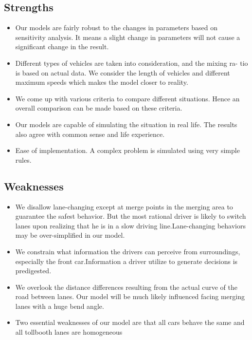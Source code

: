 \subsection{Strengths}
\begin{itemize}
\item
Our models are fairly robust to the changes in parameters based on sensitivity analysis. It means a slight change in parameters will not cause a significant change in the result.
\item
Different types of vehicles are taken into consideration, and the mixing ra-
tio is based on actual data. We consider the length of vehicles and different
maximum speeds which makes the model closer to reality.
\item
We come up with various criteria to compare different situations. Hence
an overall comparison can be made based on these criteria.
\item
Our models are capable of simulating the situation in real life. The results
also agree with common sense and life experience.
\item
Ease of implementation. A complex problem is simulated using very simple rules.
\end{itemize}

\subsection{Weaknesses}
\begin{itemize}
\item
We disallow lane-changing except at merge points in the merging area to guarantee the safest behavior. But the most rational driver is likely to switch lanes upon realizing that he is in a slow driving line.Lane-changing behaviors may be over-simplified in our model.
\item
We constrain what information the drivers can perceive from surroundings, especially the front car.Information a driver utilize to generate decisions is predigested.
\item
We overlook the distance differences resulting from the actual curve of the road between lanes. Our model will be much likely influenced facing merging lanes with a huge bend angle.
\item
Two essential weaknesses of our model are that all cars behave the same and all tollbooth lanes are homogeneous
\end{itemize}


